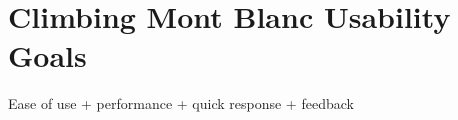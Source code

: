 \chapter{Climbing Mont Blanc Usability Goals}

Ease of use + performance + quick response + feedback 
